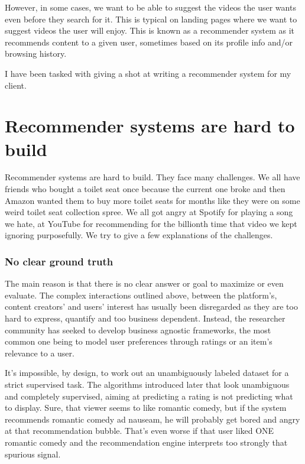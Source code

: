 However, in some cases, we want to be able to suggest the videos the user wants even before they search for it. This is typical on landing pages where we want to suggest videos the user will enjoy. This is known as a recommender system as it recommends content to a given user, sometimes based on its profile info and/or browsing history.

I have been tasked with giving a shot at writing a recommender system for my client.

\section{Recommender systems are hard to build}

Recommender systems are hard to build. They face many challenges. We all have friends who bought a toilet seat once because the current one broke and then Amazon wanted them to buy more toilet seats for months like they were on some weird toilet seat collection spree. We all got angry at Spotify for playing a song we hate, at YouTube for recommending for the billionth time that video we kept ignoring purposefully. We try to give a few explanations of the challenges.

\subsubsection{No clear ground truth}

The main reason is that there is no clear answer or goal to maximize or even evaluate. The complex interactions outlined above, between the platform's, content creators' and users' interest has usually been disregarded as they are too hard to express, quantify and too business dependent. Instead, the researcher community has seeked to develop business agnostic frameworks, the most common one being to model user preferences through ratings or an item's relevance to a user.

It's impossible, by design, to work out an unambiguously labeled dataset for a strict supervised task. The algorithms introduced later that look unambiguous and completely supervised, aiming at predicting a rating is not predicting what to display. Sure, that viewer seems to like romantic comedy, but if the system recommends romantic comedy ad nauseam, he will probably get bored and angry at that recommendation bubble. That's even worse if that user liked ONE romantic comedy and the recommendation engine interprets too strongly that spurious signal.

